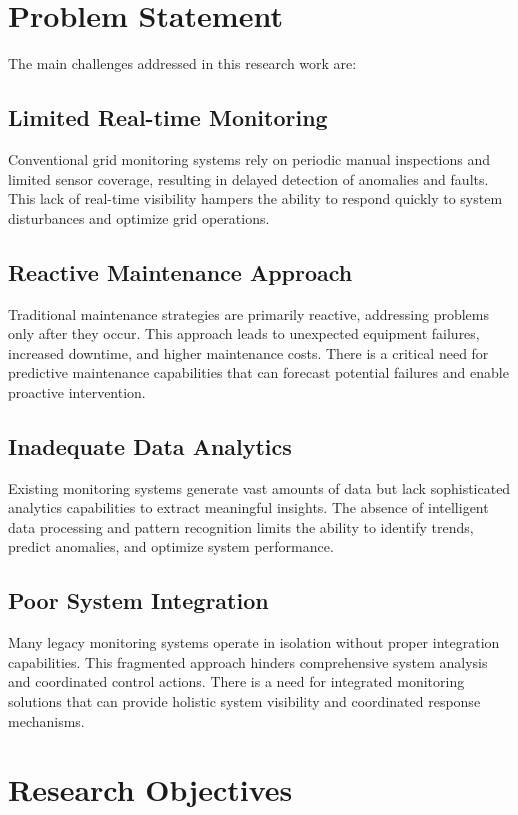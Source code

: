 \section{Problem Statement}
\label{sec:problem_statement}

The main challenges addressed in this research work are:

\subsection{Limited Real-time Monitoring}
Conventional grid monitoring systems rely on periodic manual inspections and limited sensor coverage, resulting in delayed detection of anomalies and faults. This lack of real-time visibility hampers the ability to respond quickly to system disturbances and optimize grid operations.

\subsection{Reactive Maintenance Approach}
Traditional maintenance strategies are primarily reactive, addressing problems only after they occur. This approach leads to unexpected equipment failures, increased downtime, and higher maintenance costs. There is a critical need for predictive maintenance capabilities that can forecast potential failures and enable proactive intervention.

\subsection{Inadequate Data Analytics}
Existing monitoring systems generate vast amounts of data but lack sophisticated analytics capabilities to extract meaningful insights. The absence of intelligent data processing and pattern recognition limits the ability to identify trends, predict anomalies, and optimize system performance.

\subsection{Poor System Integration}
Many legacy monitoring systems operate in isolation without proper integration capabilities. This fragmented approach hinders comprehensive system analysis and coordinated control actions. There is a need for integrated monitoring solutions that can provide holistic system visibility and coordinated response mechanisms.

\section{Research Objectives}
\label{sec:objectives}

